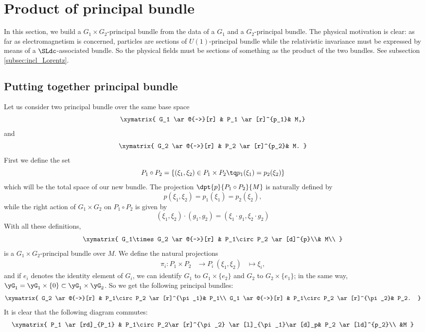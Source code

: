 \section{Product of principal bundle}\label{sec:produit_bundle}

In this section, we build a $G_1\times G_2$-principal bundle from the data of a $G_1$ and a $G_2$-principal bundle. The physical motivation is clear: as far as electromagnetism is concerned, particles are sections of $U(1)$-principal bundle while the relativistic invariance must be expressed by means of a $\SLdc$-associated bundle. So the physical fields must be sections of something as the product of the two bundles. See subsection \ref{subsec:incl_Lorentz}.

\subsection{Putting together principal bundle}

Let us consider two principal bundle over the same base space
\[
\xymatrix{
    G_1  \ar@{~>}[r] & P_1 \ar[r]^{p_1}& M,}
\]
and
\[
\xymatrix{
    G_2  \ar@{~>}[r] & P_2 \ar[r]^{p_2}& M.
  }
\]
First we define the set
\begin{equation}
  P_1\circ P_2=\{   (\xi_1,\xi_2)\in P_1\times P_2\tq p_1(\xi_1)=p_2(\xi_2)    \}
\end{equation}
which will be the total space of our new bundle. The projection $\dpt{p}{P_1\circ P_2}{M}$ is naturally defined by
\[
  p(\xi_1,\xi_2)=p_1(\xi_1)=p_2(\xi_2),
\]
while the right action of $G_1\times G_2$ on $P_1\circ P_2$ is given by
\[
  (\xi_1,\xi_2)\cdot(g_1,g_2)=(\xi_1\cdot g_1,\xi_2\cdot g_2)
\]
With all these definitions,
\[
\xymatrix{
    G_1\times G_2  \ar@{~>}[r] & P_1\circ P_2 \ar[d]^{p}\\& M\\
  }
\]
is a $G_1\times G_2$-principal bundle over $M$. We define the natural projections 
		\begin{equation}
		\begin{aligned}
			\pi_i \colon P_1\times P_2 &\to P_i\
			(\xi_1, \xi_2)&\mapsto \xi_i,
		\end{aligned}
	\end{equation}	
%
and if $e_i$ denotes the identity element of $G_i$, we can identify $G_1$ to $G_1\times \{e_2\}$ and $G_2$ to $G_2\times \{e_1\}$; in the same way, $\yG_1=\yG_1\times\{0\}\subset\yG_1\times\yG_2$. So we get the following principal bundles:
\[
\xymatrix{
    G_2  \ar@{~>}[r] & P_1\circ P_2 \ar[r]^{\pi_1}& P_1\\
    G_1  \ar@{~>}[r] & P_1\circ P_2 \ar[r]^{\pi_2}& P_2.
  }
\]
It is clear that the following diagram commutes:
\[
\xymatrix{
    P_1  \ar[rd]_{P_1} & P_1\circ P_2\ar[r]^{\pi_2} \ar[l]_{\pi_1}\ar[d]_p& P_2 \ar[ld]^{p_2}\\
    &M
  }
\]

